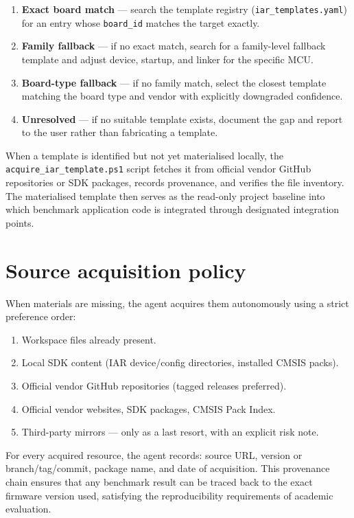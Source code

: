 \begin{enumerate}
\item \textbf{Exact board match} --- search the template registry (\texttt{iar\_templates.yaml}) for an entry whose \texttt{board\_id} matches the target exactly.
\item \textbf{Family fallback} --- if no exact match, search for a family-level fallback template and adjust device, startup, and linker for the specific MCU.
\item \textbf{Board-type fallback} --- if no family match, select the closest template matching the board type and vendor with explicitly downgraded confidence.
\item \textbf{Unresolved} --- if no suitable template exists, document the gap and report to the user rather than fabricating a template.
\end{enumerate}

When a template is identified but not yet materialised locally, the
\texttt{acquire\_iar\_template.ps1} script fetches it from official vendor GitHub
repositories or SDK packages, records provenance, and verifies the file inventory. The
materialised template then serves as the read-only project baseline into which benchmark
application code is integrated through designated integration points.

\section{Source acquisition policy}
\label{sec:agent-acquisition}

When materials are missing, the agent acquires them autonomously using a strict preference
order:

\begin{enumerate}
\item Workspace files already present.
\item Local SDK content (IAR device/config directories, installed CMSIS packs).
\item Official vendor GitHub repositories (tagged releases preferred).
\item Official vendor websites, SDK packages, CMSIS Pack Index.
\item Third-party mirrors --- only as a last resort, with an explicit risk note.
\end{enumerate}

For every acquired resource, the agent records: source URL, version or branch/tag/commit,
package name, and date of acquisition. This provenance chain ensures that any benchmark
result can be traced back to the exact firmware version used, satisfying the
reproducibility requirements of academic evaluation.

